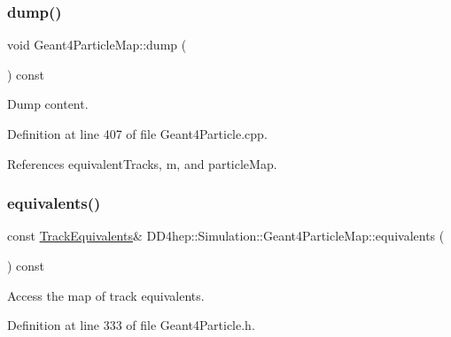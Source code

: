 \subsubsection{\texorpdfstring{dump()}{dump()}}
{\footnotesize\ttfamily void Geant4\+Particle\+Map\+::dump (\begin{DoxyParamCaption}{ }\end{DoxyParamCaption}) const}



Dump content. 



Definition at line 407 of file Geant4\+Particle.\+cpp.



References equivalent\+Tracks, m, and particle\+Map.

\hypertarget{class_d_d4hep_1_1_simulation_1_1_geant4_particle_map_ab89bd6bc306026573b1d0db0b31f83d3}{}\label{class_d_d4hep_1_1_simulation_1_1_geant4_particle_map_ab89bd6bc306026573b1d0db0b31f83d3} 
\subsubsection{\texorpdfstring{equivalents()}{equivalents()}}
{\footnotesize\ttfamily const \hyperlink{class_d_d4hep_1_1_simulation_1_1_geant4_particle_map_aba09f5fcb2dd5874d129660ad4454a21}{Track\+Equivalents}\& D\+D4hep\+::\+Simulation\+::\+Geant4\+Particle\+Map\+::equivalents (\begin{DoxyParamCaption}{ }\end{DoxyParamCaption}) const\hspace{0.3cm}{\ttfamily [inline]}}



Access the map of track equivalents. 



Definition at line 333 of file Geant4\+Particle.\+h.

\hypertarget{class_d_d4hep_1_1_simulation_1_1_geant4_particle_map_afdd0deb9d62fc4321014d2113cb9ee99}{}\label{class_d_d4hep_1_1_simulation_1_1_geant4_particle_map_afdd0deb9d62fc4321014d2113cb9ee99} 
